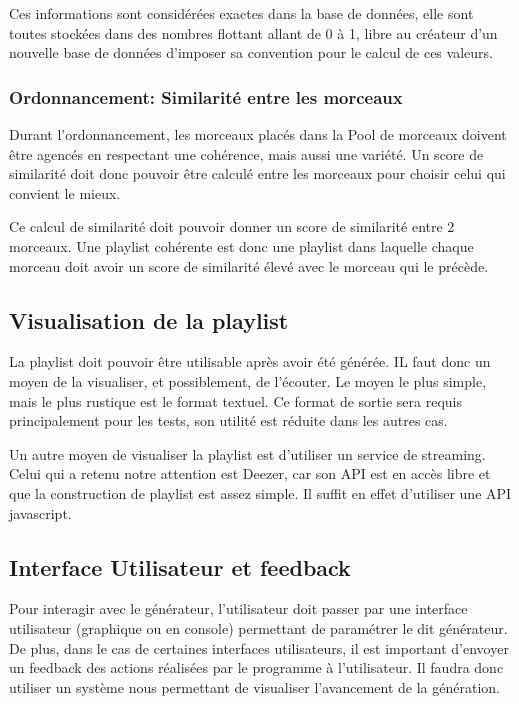 Ces informations sont considérées exactes dans la base de données, elle sont toutes stockées dans des nombres flottant allant de 0 à 1, libre au créateur d'un nouvelle base de données d'imposer sa convention pour le calcul de ces valeurs.

\subsubsection{Ordonnancement: Similarité entre les morceaux}
\label{besoins:fonc:generation:selection:ordonnancement}

Durant l'ordonnancement, les morceaux placés dans la Pool de morceaux doivent être agencés en respectant une cohérence, mais aussi une variété. Un score de similarité doit donc pouvoir être calculé entre les morceaux pour choisir celui qui convient le mieux.

Ce calcul de similarité doit pouvoir donner un score de similarité entre 2 morceaux. Une playlist cohérente est donc une playlist dans laquelle chaque morceau doit avoir un score de similarité élevé avec le morceau qui le précède.

\subsection{Visualisation de la playlist}
\label{besoins:fonc:generation:visu}

La playlist doit pouvoir être utilisable après avoir été générée. IL faut donc un
moyen de la visualiser, et possiblement, de l’écouter.
Le moyen le plus simple, mais le plus rustique est le format textuel. Ce format
de sortie sera requis principalement pour les tests, son utilité est réduite dans
les autres cas.

Un autre moyen de visualiser la playlist est d’utiliser un service de streaming.
Celui qui a retenu notre attention est Deezer, car son API est en accès libre et
que la construction de playlist est assez simple. Il suffit en effet d’utiliser
une API javascript.
        
\subsection{Interface Utilisateur et feedback}
\label{besoins:fonc:generation:feedback}

Pour interagir avec le générateur, l’utilisateur doit passer par une interface
utilisateur (graphique ou en console) permettant de paramétrer le dit générateur.
De plus, dans le cas de certaines interfaces utilisateurs, il est important
d’envoyer un feedback des actions réalisées par le programme à l’utilisateur. Il
faudra donc utiliser un système nous permettant de visualiser l’avancement de la
génération.

